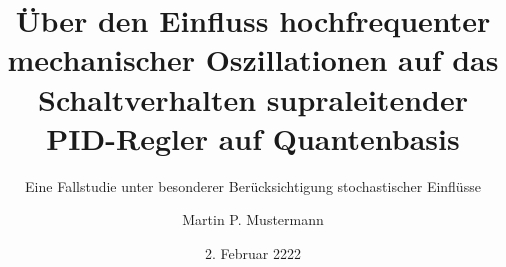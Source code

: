\documentclass[arbeit=master,oneside,BCOR=12mm]{ArbeitRST}
\begin{document}

\author{Martin P. Mustermann}



\title{Über den Einfluss hochfrequenter mechanischer Oszillationen auf das Schaltverhalten supraleitender PID-Regler auf Quantenbasis}

\subtitle{Eine Fallstudie unter besonderer Berücksichtigung stochastischer Einflüsse}


\date{2. Februar 2222}


\pagestyle{plain}


\maketitle





\selbststaendigkeitserklaerung




\tableofcontents



\listoffigures


\listoftables




\end{document}
